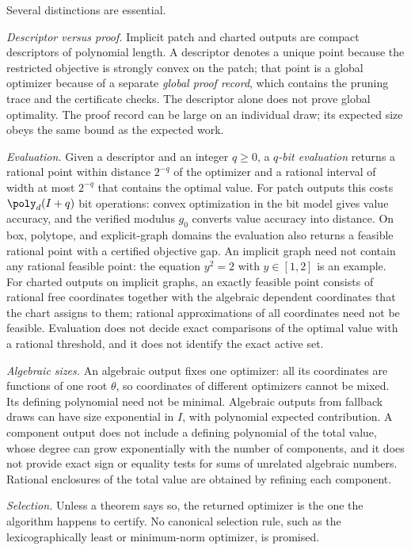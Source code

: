 Several distinctions are essential.

\emph{Descriptor versus proof.} Implicit patch and charted outputs are
compact descriptors of polynomial length. A descriptor denotes a unique
point because the restricted objective is strongly convex on the patch;
that point is a global optimizer because of a separate \emph{global proof
record}, which contains the pruning trace and the certificate checks. The
descriptor alone does not prove global optimality. The proof record can be
large on an individual draw; its expected size obeys the same bound as the
expected work.

\emph{Evaluation.} Given a descriptor and an integer $q\ge0$, a
\emph{$q$-bit evaluation} returns a rational point within distance $2^{-q}$
of the optimizer and a rational interval of width at most $2^{-q}$ that
contains the optimal value. For patch outputs this costs $\poly_d(I+q)$ bit
operations: convex optimization in the bit model gives value accuracy, and
the verified modulus $g_0$ converts value accuracy into distance. On box,
polytope, and explicit-graph domains the evaluation also returns a feasible
rational point with a certified objective gap. An implicit graph need not
contain any rational feasible point: the equation $y^2=2$ with $y\in[1,2]$
is an example. For charted outputs on implicit graphs, an exactly feasible
point consists of rational free coordinates together with the algebraic
dependent coordinates that the chart assigns to them; rational
approximations of all coordinates need not be feasible. Evaluation does not
decide exact comparisons of the optimal value with a rational threshold,
and it does not identify the exact active set.

\emph{Algebraic sizes.} An algebraic output fixes one optimizer: all its
coordinates are functions of one root $\theta$, so coordinates of different
optimizers cannot be mixed. Its defining polynomial need not be minimal.
Algebraic outputs from fallback draws can have size exponential in $I$, with
polynomial expected contribution. A component output does not include a
defining polynomial of the total value, whose degree can grow exponentially
with the number of components, and it does not provide exact sign or
equality tests for sums of unrelated algebraic numbers. Rational
enclosures of the total value are obtained by refining each component.

\emph{Selection.} Unless a theorem says so, the returned optimizer is the
one the algorithm happens to certify. No canonical selection rule, such as
the lexicographically least or minimum-norm optimizer, is promised.

